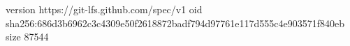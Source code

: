 version https://git-lfs.github.com/spec/v1
oid sha256:686d3b6962c3c4309e50f2618872badf794d97761e117d555c4e903571f840eb
size 87544

